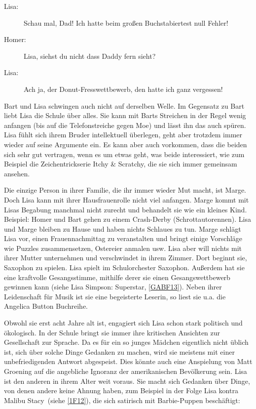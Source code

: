 \begin{description}
	\item[Lisa:] \glqq Schau mal, Dad! Ich hatte beim großen Buchstabiertest null Fehler!\grqq
	\item[Homer:] \glqq Lisa, siehst du nicht dass Daddy fern sieht?\grqq
	\item[Lisa:] \glqq Ach ja, der Donut-Fresswettbewerb, den hatte ich ganz vergessen!\grqq
\end{description}

Bart und Lisa schwingen auch nicht auf derselben Welle. Im Gegensatz zu Bart liebt Lisa die Schule über alles. Sie kann mit Barts Streichen in der Regel wenig anfangen (bis auf die Telefonstreiche gegen Moe) und lässt ihn das auch spüren. Lisa fühlt sich ihrem Bruder intellektuell überlegen, geht aber trotzdem immer wieder auf seine Argumente ein. Es kann aber auch vorkommen, dass die beiden sich sehr gut vertragen, wenn es um etwas geht, was beide interessiert, wie zum Beispiel die Zeichentrickserie \glqq Itchy \& Scratchy\grqq , die sie sich immer gemeinsam ansehen.

Die einzige Person in ihrer Familie, die ihr immer wieder Mut macht, ist Marge. Doch Lisa kann mit ihrer Hausfrauenrolle nicht viel anfangen. Marge kommt mit Lisas Begabung manchmal nicht zurecht und behandelt sie wie ein kleines Kind. Beispiel: Homer und Bart gehen zu einem Crash-Derby (Schrottautorennen). Lisa und Marge bleiben zu Hause und haben nichts Schlaues zu tun. Marge schlägt Lisa vor, einen Frauennachmittag zu veranstalten und bringt einige Vorschläge wie Puzzles zusammensetzen, Ostereier anmalen usw. Lisa aber will nichts mit ihrer Mutter unternehmen und verschwindet in ihrem Zimmer. Dort beginnt sie, Saxophon zu spielen. Lisa spielt im Schulorchester Saxophon. Außerdem hat sie eine kraftvolle Gesangsstimme, mithilfe derer sie einen Gesangswettbewerb gewinnen kann (siehe \glqq Lisa Simpson: Superstar\grqq , \ref{GABF13}). Neben ihrer Leidenschaft für Musik ist sie eine begeisterte Leserin, so liest sie u.a. die Angelica Button Buchreihe.

Obwohl sie erst acht Jahre alt ist, engagiert sich Lisa schon stark politisch und ökologisch. In der Schule bringt sie immer ihre kritischen Ansichten zur Gesellschaft zur Sprache. Da es für ein so junges Mädchen eigentlich nicht üblich ist, sich über solche Dinge Gedanken zu machen, wird sie meistens mit einer unbefriedigenden Antwort abgespeist. Dies könnte auch eine Anspielung von Matt Groening auf die angebliche Ignoranz der amerikanischen Bevölkerung sein. Lisa ist den anderen in ihrem Alter weit voraus. Sie macht sich Gedanken über Dinge, von denen andere keine Ahnung haben, zum Beispiel in der Folge \glqq Lisa kontra Malibu Stacy\grqq\ (siehe \ref{1F12}), die sich satirisch mit Barbie-Puppen beschäftigt:

